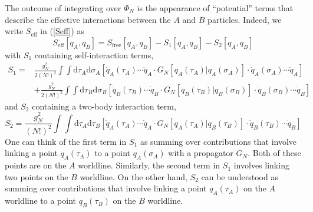 The outcome of integrating over $\Phi_{N}$ is the appearance of ``potential'' terms that describe the effective interactions between the $A$ and $B$ particles. Indeed, we write $S_{\text{eff}}$ in (\ref{Seff}) as
\begin{equation}
	S_{\text{eff}}[q_{A}, q_{B}] = S_{\text{free}}[q_{A}, q_{B}] - S_{1}[q_{A}, q_{B}] - S_{2}[q_{A}, q_{B}]
\end{equation}
with $S_{1}$ containing self-interaction terms,
\begin{equation}
\begin{split}
	S_{1} = {}& \frac{g_{N}^{2}}{2 (N!)^{2}} \int \int \mathrm{d}\tau_{A} \mathrm{d}\sigma_{A} \left[ \dot{q}_{A}(\tau_{A}) \cdots \dot{q}_{A} \cdot G_{N}[q_{A}(\tau_{A}) | q_{A}(\sigma_{A})] \cdot \dot{q}_{A}(\sigma_{A}) \cdots \dot{q}_{A} \right] \\
	&+ \frac{g_{N}^{2}}{2 (N!)^{2}} \int \int \mathrm{d}\tau_{B} \mathrm{d}\sigma_{B} \left[ \dot{q}_{B}(\tau_{B}) \cdots \dot{q}_{B} \cdot G_{N}[q_{B}(\tau_{B}) | q_{B}(\sigma_{B})] \cdot \dot{q}_{B}(\sigma_{B}) \cdots \dot{q}_{B} \right]
\end{split} \label{S10}
\end{equation}
and $S_{2}$ containing a two-body interaction term,
\begin{equation}
	S_{2} = \frac{g_{N}^{2}}{(N!)^{2}} \int \int \mathrm{d}\tau_{A} \mathrm{d}\tau_{B} \left[ \dot{q}_{A}(\tau_{A}) \cdots \dot{q}_{A} \cdot G_{N}[q_{A}(\tau_{A}) | q_{B}(\tau_{B})] \cdot \dot{q}_{B}(\tau_{B}) \cdots \dot{q}_{B} \right] \label{S20}
\end{equation}
One can think of the first term in $S_{1}$ as summing over contributions that involve linking a point $q_{A}(\tau_{A})$ to a point $q_{A}(\sigma_{A})$ with a propagator $G_{N}$. Both of these points are on the $A$ worldline. Similarly, the second term in $S_{1}$ involves linking two points on the $B$ worldline. On the other hand, $S_{2}$ can be understood as summing over contributions that involve linking a point $q_{A}(\tau_{A})$ on the $A$ worldline to a point $q_{B}(\tau_{B})$ on the $B$ worldline.

